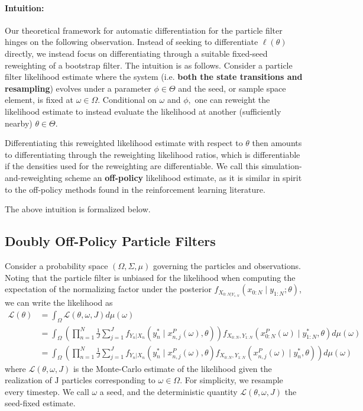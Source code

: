 \documentclass{article}
\begin{document}
\paragraph{Intuition:} 
Our theoretical framework for automatic differentiation for the particle filter hinges on the following observation. Instead of seeking to differentiate $\ell(\theta)$ directly, we instead focus on differentiating through a suitable fixed-seed reweighting of a bootstrap filter. The intuition is as follows. Consider a particle filter likelihood estimate where the system (i.e. \textbf{both the state transitions and resampling}) evolves under a parameter $\phi \in \Theta$ and the seed, or sample space element, is fixed at $\omega \in \Omega.$ Conditional on $\omega$ and $\phi,$ one can reweight the likelihood estimate to instead evaluate the likelihood at another (sufficiently nearby) $\theta \in \Theta.$ 


Differentiating this reweighted likelihood estimate with respect to $\theta$ then amounts to differentiating through the reweighting likelihood ratios, which is differentiable if the densities used for the reweighting are differentiable. We call this simulation-and-reweighting scheme an \textbf{off-policy} likelihood estimate, as it is similar in spirit to the off-policy methods found in the reinforcement learning literature.

The above intuition is formalized below.


\subsection{Doubly Off-Policy Particle Filters}


\begin{defn}
\label{defn:seed-fixing}
Consider a probability space $(\Omega, \Sigma, \mu)$ governing the particles and observations. Noting that the particle filter is unbiased for the likelihood when computing the expectation of the normalizing factor under the posterior $f_{X_{0:N|Y_{1:N}}}\left(x_{0: N} \mid y_{1: N}; \theta\right)$, we can write the likelihood as
$$
\begin{aligned}
\mathcal{L}(\theta) & =\int_{\Omega} \mathcal{L}(\theta, \omega, J) d \mu(\omega) \\
& =\int_{\Omega}\left(\prod_{n=1}^N \frac{1}{J} \sum_{j=1}^J f_{Y_n|X_n}\left(y_n^* \mid x_{n, j}^P(\omega), \theta\right)\right) f_{X_{0:N}, Y_{1:N}}\left(x_{0: N}^P(\omega) \mid y_{1: N}^*, \theta\right) d \mu(\omega) \\
& =\int_{\Omega}\left(\prod_{n=1}^N \frac{1}{J} \sum_{j=1}^J f_{Y_n|X_n}\left(y_n^* \mid x_{n, j}^P(\omega), \theta\right) f_{X_{0:N}, Y_{1:N}}\left(x_{n, j}^P(\omega) \mid y_n^*, \theta\right)\right) d \mu(\omega)
\end{aligned}
$$
where $\mathcal{L}(\theta, \omega, J)$ is the Monte-Carlo estimate of the likelihood given the realization of $\mathrm{J}$ particles corresponding to $\omega \in \Omega$. For simplicity, we resample every timestep. We call $\omega$ a seed, and the deterministic quantity $\mathcal{L}(\theta, \omega, J)$ the seed-fixed estimate.
\end{defn}
\end{document}

